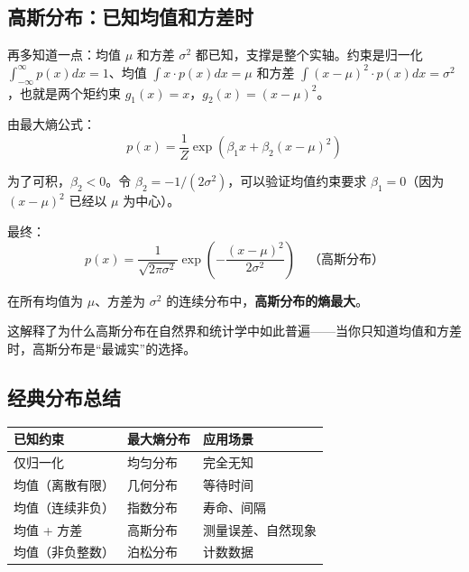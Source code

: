 \subsection{高斯分布：已知均值和方差时}

再多知道一点：均值 $\mu$ 和方差 $\sigma^2$ 都已知，支撑是整个实轴。约束是归一化 $\int_{-\infty}^{\infty} p(x) dx = 1$、均值 $\int x \cdot p(x) dx = \mu$ 和方差 $\int (x-\mu)^2 \cdot p(x) dx = \sigma^2$，也就是两个矩约束 $g_1(x) = x$，$g_2(x) = (x-\mu)^2$。

由最大熵公式：
\begin{equation}
p(x) = \frac{1}{Z} \exp\left( \beta_1 x + \beta_2 (x-\mu)^2 \right)
\end{equation}

为了可积，$\beta_2 < 0$。令 $\beta_2 = -1/(2\sigma^2)$，可以验证均值约束要求 $\beta_1 = 0$（因为 $(x-\mu)^2$ 已经以 $\mu$ 为中心）。

最终：
\begin{equation}
\boxed{p(x) = \frac{1}{\sqrt{2\pi\sigma^2}} \exp\left( -\frac{(x-\mu)^2}{2\sigma^2} \right)} \quad \text{（高斯分布）}
\end{equation}

\begin{keytheorem}[title=高斯分布的最大熵性质]
在所有均值为 $\mu$、方差为 $\sigma^2$ 的连续分布中，\textbf{高斯分布的熵最大}。

这解释了为什么高斯分布在自然界和统计学中如此普遍——当你只知道均值和方差时，高斯分布是“最诚实”的选择。
\end{keytheorem}

\subsection{经典分布总结}

\begin{center}
\renewcommand{\arraystretch}{1.5}
\begin{tabular}{l|l|l}
\toprule
\textbf{已知约束} & \textbf{最大熵分布} & \textbf{应用场景} \\
\midrule
仅归一化 & 均匀分布 & 完全无知 \\
均值（离散有限） & 几何分布 & 等待时间 \\
均值（连续非负） & 指数分布 & 寿命、间隔 \\
均值 + 方差 & 高斯分布 & 测量误差、自然现象 \\
均值（非负整数） & 泊松分布 & 计数数据 \\
\bottomrule
\end{tabular}
\end{center}

